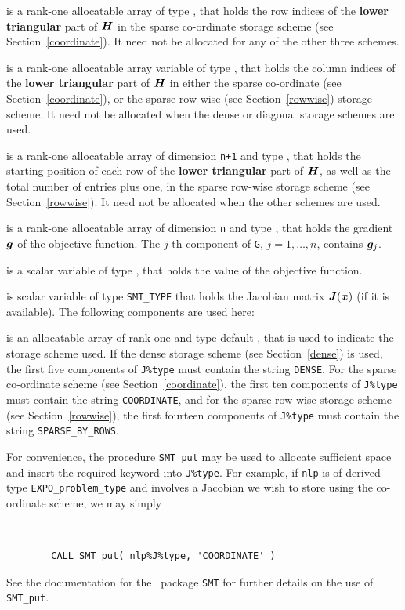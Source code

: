 \documentclass{galahad}
\newcommand{\packagename}{EXPO}
\begin{document}
\begin{description}
\begin{description}
 is a rank-one allocatable array of type \integer,
that holds the row indices of the {\bf lower triangular} part of ${\bm{H}}$
in the sparse co-ordinate storage
scheme (see Section~\ref{coordinate}).
It need not be allocated for any of the other three schemes.

 is a rank-one allocatable array variable of type \integer,
that holds the column indices of the {\bf lower triangular} part of
${\bm{H}}$ in either the sparse co-ordinate
(see Section~\ref{coordinate}), or the sparse row-wise
(see Section~\ref{rowwise}) storage scheme.
It need not be allocated when the dense or diagonal storage schemes are used.

 is a rank-one allocatable array of dimension {\tt n+1} and type
\integer, that holds the starting position of
each row of the {\bf lower triangular} part of ${\bm{H}}$, as well
as the total number of entries plus one, in the sparse row-wise storage
scheme (see Section~\ref{rowwise}). It need not be allocated when the
other schemes are used.

\end{description}

 is a rank-one allocatable array of dimension {\tt n} and type
\realdp, that holds the gradient ${\bm{g}}$ of the objective function.
The $j$-th component of {\tt G}, $j = 1,  \ldots ,  n$, contains ${\bm{g}}_{j}$.

 is a scalar variable of type
\realdp, that holds the value of the objective function.

 is scalar variable of type {\tt SMT\_TYPE}
that holds the Jacobian matrix ${\bm{J}}({\bm{x}})$ (if it is available).
The following components are used here:

\begin{description}

 is an allocatable array of rank one and type default
\character, that
is used to indicate the storage scheme used. If the dense storage scheme
(see Section~\ref{dense}) is used,
the first five components of {\tt J\%type} must contain the
string {\tt DENSE}.
For the sparse co-ordinate scheme (see Section~\ref{coordinate}),
the first ten components of {\tt J\%type} must contain the
string {\tt COORDINATE},
and for the sparse row-wise storage scheme (see Section~\ref{rowwise}),
the first fourteen components of {\tt J\%type} must contain the
string {\tt SPARSE\_BY\_ROWS}.

For convenience, the procedure {\tt SMT\_put}
may be used to allocate sufficient space and insert the required keyword
into {\tt J\%type}.
For example, if {\tt nlp} is of derived type {\tt \packagename\_problem\_type}
and involves a Jacobian we wish to store using the co-ordinate scheme,
we may simply
{\tt
\begin{verbatim}
        CALL SMT_put( nlp%J%type, 'COORDINATE' )
\end{verbatim}
}
\noindent
See the documentation for the \galahad\ package {\tt SMT}
for further details on the use of {\tt SMT\_put}.


\end{description}
\end{description}
\end{document}
